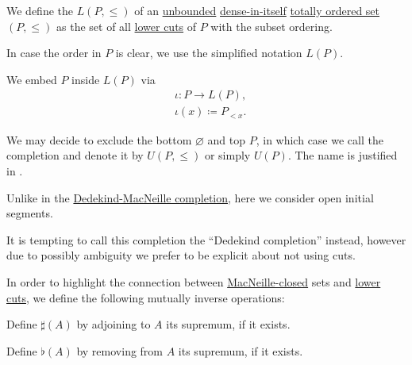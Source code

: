 \begin{definition}\label{def:lower_cut_completion}\mimprovised
  We define the  \( L(P, \leq) \) of an \hyperref[def:extremal_points/bounds]{unbounded} \hyperref[def:dense_total_order]{dense-in-itself} \hyperref[def:totally_ordered_set]{totally ordered set} \( (P, \leq) \) as the set of all \hyperref[def:lower_cut]{lower cuts} of \( P \) with the subset ordering.

  In case the order in \( P \) is clear, we use the simplified notation \( L(P) \).

  We embed \( P \) inside \( L(P) \) via
  \begin{equation*}
    \begin{aligned}
      &\iota: P \to L(P), \\
      &\iota(x) \coloneqq P_{<x}.
    \end{aligned}
  \end{equation*}

  We may decide to exclude the bottom \( \varnothing \) and top \( P \), in which case we call the completion  and denote it by \( U(P, \leq) \) or simply \( U(P) \). The name is justified in .
\end{definition}
\begin{comments}
  \item Unlike in the \hyperref[def:dedekind_macnielle_completion]{Dedekind-MacNeille completion}, here we consider open initial segments.
  \item It is tempting to call this completion the \enquote{Dedekind completion} instead, however due to possibly ambiguity we prefer to be explicit about not using cuts.
\end{comments}

\begin{definition}\label{def:lower_cut_closure}\mimprovised
  In order to highlight the connection between \hyperref[def:macnielle_closure]{MacNeille-closed} sets and \hyperref[def:lower_cut]{lower cuts}, we define the following mutually inverse operations:

  \begin{thmenum}
     Define \( \sharp(A) \) by adjoining to \( A \) its supremum, if it exists.

     Define \( \flat(A) \) by removing from \( A \) its supremum, if it exists.
  \end{thmenum}
\end{definition}

